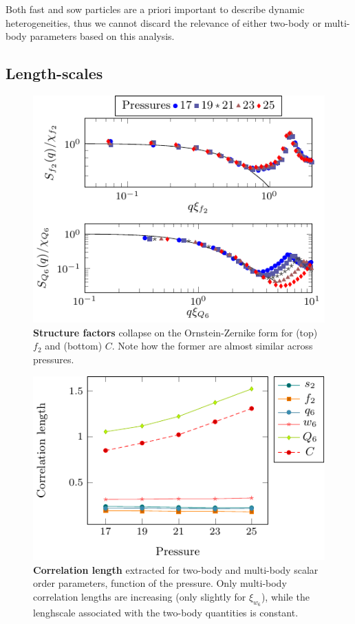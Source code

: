 \documentclass[twocolumn,superscriptaddress]{revtex4-1}
\begin{document}
Both fast and sow particles are a priori important to describe dynamic heterogeneities, thus we cannot discard the relevance of either two-body or multi-body parameters based on this analysis.

\subsection{Length-scales}
\begin{figure}
	\centering
	\includegraphics{fig_structurefactor}
	\caption{\textbf{Structure factors} collapse on the Ornstein-Zernike form for (top) $f_2$ and (bottom) $C$. Note how the former are almost similar across pressures.}
	\label{fig:structurefactor}
\end{figure}

\begin{figure}
	\centering
	\includegraphics{fig_lengths}
	\caption{\textbf{Correlation length} extracted for two-body and multi-body scalar order parameters, function of the pressure. Only multi-body correlation lengths are increasing (only slightly for $\xi_{w_6}$), while the lenghscale associated with the two-body quantities is constant.}
	\label{fig:Fourierlengths}
\end{figure}
\end{document}
